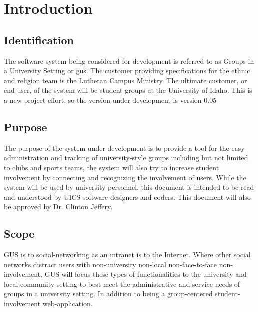 \chapter{Introduction}
	\section{Identification}
		The software system being considered for development is referred
		to as Groups in a University Setting or gus. The customer providing
		specifications for the ethnic and religion team is the Lutheran
		Campus Ministry. The ultimate customer, or end-user, of the system
		will be student groups at the University of Idaho. This is a new
		project effort, so the version under development is version 0.05
	\section{Purpose}
		The purpose of the system under development is to provide a tool
		for the easy administration and tracking of university-style groups
		including but not limited to clubs and sports teams, the system will
		also try to increase student involvement by connecting and recognizing
		the involvement of users. While the system will be used by university
		personnel, this document is intended to be read and understood by UICS
		software designers and coders.  This document will also be approved by
		Dr. Clinton Jeffery.
	\section{Scope}
		GUS is to social-networking as an intranet is to the Internet.
		Where other social networks distract users with non-university
		non-local non-face-to-face non-involvement, GUS will focus these
		types of functionalities to the university and local community
		setting to best meet the administrative and service needs of groups
		in a university setting.  In addition to being a group-centered
		student-involvement web-application.
